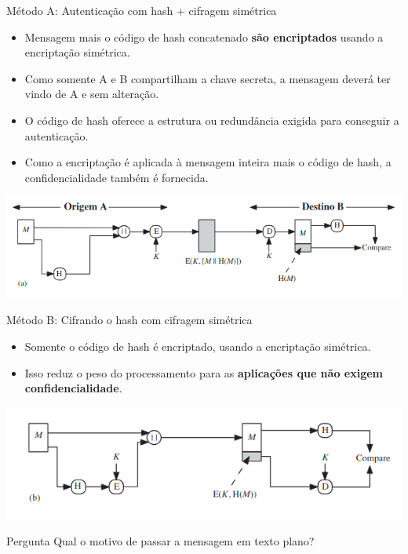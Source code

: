\begin{frame}{Método A: Autenticação com hash + cifragem simétrica}
    \begin{itemize}
        \item Mensagem mais o código de hash concatenado \textbf{são encriptados} usando a encriptação simétrica.
        \item Como somente A e B compartilham a chave secreta, a mensagem deverá ter vindo de A e sem alteração.
        \item O código de hash oferece a estrutura ou redundância exigida para conseguir a autenticação.
        \item Como a encriptação é aplicada à mensagem inteira mais o código de hash, a confidencialidade também é fornecida.
    \end{itemize}

    \centering
\includegraphics[width=0.7\linewidth]{Figuras/esquema1-hash.png}
\end{frame}

\begin{frame}{Método B: Cifrando o hash com cifragem simétrica}
    \begin{itemize}
        \item Somente o código de hash é encriptado, usando a encriptação simétrica. 
        \item Isso reduz o peso do processamento para as \textbf{aplicações que não exigem confidencialidade}.

    \end{itemize}

    \centering
\includegraphics[width=0.7\linewidth]{Figuras/esquema2-hash.png}
\begin{block}{Pergunta}
    Qual o motivo de passar a mensagem em texto plano?
\end{block}
\end{frame}

